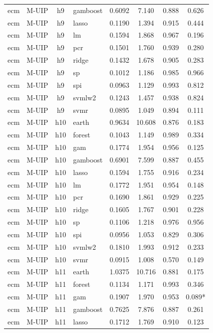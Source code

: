 \begin{ThreePartTable}
\begin{longtable}[t]{llclcccc}
ecm & M-UIP & h9 & gamboost & 0.6092 & 7.140 & 0.888 & 0.626\\
ecm & M-UIP & h9 & lasso & 0.1190 & 1.394 & 0.915 & 0.444\\
ecm & M-UIP & h9 & lm & 0.1594 & 1.868 & 0.967 & 0.196\\
ecm & M-UIP & h9 & pcr & 0.1501 & 1.760 & 0.939 & 0.280\\
ecm & M-UIP & h9 & ridge & 0.1432 & 1.678 & 0.905 & 0.283\\
ecm & M-UIP & h9 & sp & 0.1012 & 1.186 & 0.985 & 0.966\\
ecm & M-UIP & h9 & spi & 0.0963 & 1.129 & 0.993 & 0.812\\
ecm & M-UIP & h9 & svmlw2 & 0.1243 & 1.457 & 0.938 & 0.824\\
ecm & M-UIP & h9 & svmr & 0.0895 & 1.049 & 0.894 & 0.111\\
\addlinespace
ecm & M-UIP & h10 & earth & 0.9634 & 10.608 & 0.876 & 0.183\\
ecm & M-UIP & h10 & forest & 0.1043 & 1.149 & 0.989 & 0.334\\
ecm & M-UIP & h10 & gam & 0.1774 & 1.954 & 0.956 & 0.125\\
ecm & M-UIP & h10 & gamboost & 0.6901 & 7.599 & 0.887 & 0.455\\
ecm & M-UIP & h10 & lasso & 0.1594 & 1.755 & 0.916 & 0.234\\
ecm & M-UIP & h10 & lm & 0.1772 & 1.951 & 0.954 & 0.148\\
ecm & M-UIP & h10 & pcr & 0.1690 & 1.861 & 0.929 & 0.225\\
ecm & M-UIP & h10 & ridge & 0.1605 & 1.767 & 0.901 & 0.228\\
ecm & M-UIP & h10 & sp & 0.1106 & 1.218 & 0.976 & 0.956\\
ecm & M-UIP & h10 & spi & 0.0956 & 1.053 & 0.829 & 0.306\\
ecm & M-UIP & h10 & svmlw2 & 0.1810 & 1.993 & 0.912 & 0.233\\
ecm & M-UIP & h10 & svmr & 0.0915 & 1.008 & 0.570 & 0.149\\
\addlinespace
ecm & M-UIP & h11 & earth & 1.0375 & 10.716 & 0.881 & 0.175\\
ecm & M-UIP & h11 & forest & 0.1134 & 1.171 & 0.993 & 0.346\\
ecm & M-UIP & h11 & gam & 0.1907 & 1.970 & 0.953 & 0.089*\\
ecm & M-UIP & h11 & gamboost & 0.7625 & 7.876 & 0.887 & 0.261\\
ecm & M-UIP & h11 & lasso & 0.1712 & 1.769 & 0.910 & 0.123\\

\end{longtable}
\end{ThreePartTable}
